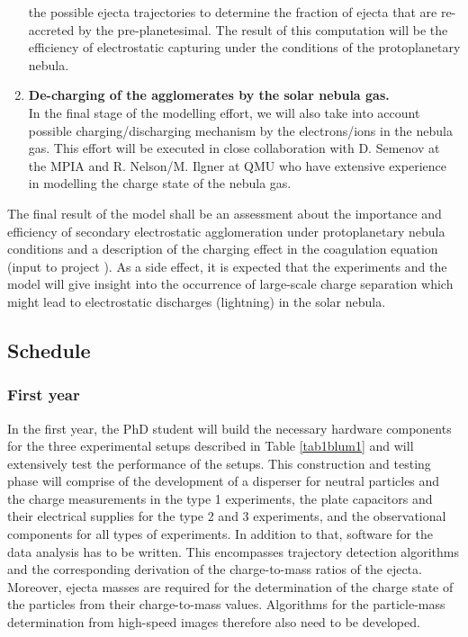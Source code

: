 \begin{enumerate}
    the possible ejecta trajectories to determine the fraction of
    ejecta that are re-accreted by the pre-planetesimal. The
    result of this computation will be the efficiency of
    electrostatic capturing under the conditions of the
    protoplanetary nebula.
    \item {\bf De-charging of the agglomerates by the solar nebula
    gas.}\\
    In the final stage of the modelling effort, we will also take
    into account possible charging/discharging mechanism by the
    electrons/ions in the nebula gas. This effort will be executed
    in close collaboration with D. Semenov at the MPIA and R.
    Nelson/M. Ilgner at QMU who have extensive experience
    in modelling the charge state of the nebula gas.
\end{enumerate}

The final result of the model shall be an assessment about the
importance and efficiency of secondary electrostatic agglomeration
under protoplanetary nebula conditions and a description of the
charging effect in the coagulation equation (input to project
\projdul{}). As a side effect, it is expected that the experiments
and the model will give insight into the occurrence of large-scale
charge separation which might lead to electrostatic discharges
(lightning) in the solar nebula.


\subsection{Schedule}

\subsubsection{First year}
In the first year, the PhD student will build the necessary
hardware components for the three experimental setups described in
Table \ref{tab1blum1} and will extensively test the performance of
the setups. This construction and testing phase will comprise of
the development of a disperser for neutral particles and the
charge measurements in the type 1 experiments, the plate
capacitors and their electrical supplies for the type 2 and 3
experiments, and the observational components for all types of
experiments. In addition to that, software for the data analysis
has to be written. This encompasses trajectory detection
algorithms and the corresponding derivation of the charge-to-mass
ratios of the ejecta. Moreover, ejecta masses are required for the
determination of the charge state of the particles from their
charge-to-mass values. Algorithms for the particle-mass
determination from high-speed images therefore also need to be
developed.

